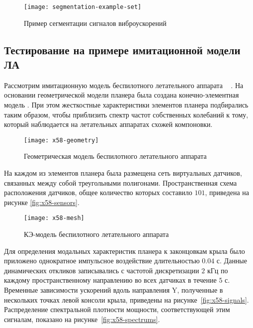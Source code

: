 \begin{figure}[!htb]
	\centerfloat
	\texttt{[image: segmentation-example-set]}
	\caption{Пример сегментации сигналов виброускорений} \label{fig:segmentation-example}
\end{figure}

\subsection{Тестирование на примере имитационной модели ЛА}

Рассмотрим имитационную модель беспилотного летательного аппарата ~ \cite{lib:misc:x58}. На основании геометрической модели планера была создана конечно-элементная модель  . При этом жесткостные характеристики элементов планера подбирались таким образом, чтобы приблизить спектр частот собственных колебаний к тому, который наблюдается на летательных аппаратах схожей компоновки.

\begin{figure}[!htb]
	\centerfloat
	\texttt{[image: x58-geometry]}
	\caption{Геометрическая модель беспилотного летательного аппарата} \label{fig:x58-geometry}
\end{figure}

На каждом из элементов планера была размещена сеть виртуальных датчиков, связанных между собой треугольными полигонами. Пространственная схема расположения датчиков, общее количество которых составило $ 101 $, приведена на рисунке \ref{fig:x58-sensors}.

\begin{figure}[!htb]
	\centerfloat
	\texttt{[image: x58-mesh]}
	\caption{КЭ-модель беспилотного летательного аппарата} \label{fig:x58-mesh}
\end{figure}

Для определения модальных характеристик планера к законцовкам крыла было приложено однократное импульсное воздействие длительностью $ 0.04 $ с. Данные динамических откликов записывались с частотой дискретизации $ 2 $ кГц по каждому пространственному направлению во всех датчиках в течение $ 5 $ с. Временные зависимости ускорений вдоль направления Y, полученные в нескольких точках левой консоли крыла, приведены на рисунке~\ref{fig:x58-signals}. Распределение спектральной плотности мощности, соответствующей этим сигналам, показано на рисунке~\ref{fig:x58-spectrums}.

